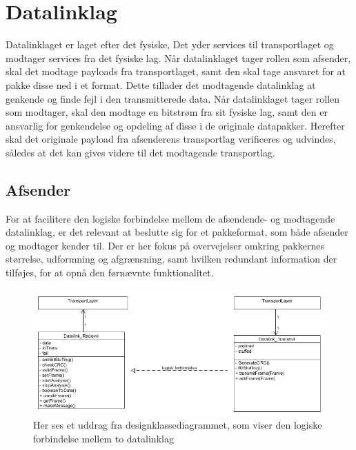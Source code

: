 \section{Datalinklag}
Datalinklaget er laget efter det fysiske, Det yder services til transportlaget og modtager services fra det fysiske lag.
Når datalinklaget tager rollen som afsender, skal det modtage payloads fra transportlaget, samt den skal tage ansvaret for at pakke disse ned i et format.
Dette tillader det modtagende datalinklag at genkende og finde fejl i den transmitterede data.
Når datalinklaget tager rollen som modtager, skal den modtage en bitstrøm fra sit fysiske lag, samt den er ansvarlig for genkendelse og opdeling af disse i de originale datapakker.
Herefter skal det originale payload fra afsenderens transportlag verificeres og udvindes, således at det kan gives videre til det modtagende transportlag.

\subsection{Afsender}
For at facilitere den logiske forbindelse mellem de afsendende- og modtagende datalinklag, er det relevant at beslutte sig for et pakkeformat, som både afsender og modtager kender til. Der er her fokus på overvejelser omkring pakkernes størrelse, udformning og afgrænsning, samt hvilken redundant information der tilføjes, for at opnå den førnævnte funktionalitet.

\begin{figure}[h!]
\centering
\includegraphics[scale=0.7]{Billeder/DataLinkLogical.PNG}
\caption{Her ses et uddrag fra designklassediagrammet, som viser den logiske forbindelse mellem to datalinklag}
\label{fig:DataLinkLogical}
\end{figure}

